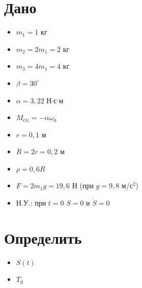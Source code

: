 \documentclass{article}
\begin{document}
\section*{Дано}
\vspace{-0.5cm}
\begin{itemize}
	\item $m_1 = 1$ кг
	\item $m_2 = 2m_1 = 2$ кг
	\item $m_3 = 4m_1 = 4$ кг
	\item $\beta = 30^\circ$
	\item $\alpha = 3,22$ Н$\cdot$с$\cdot$м
	\item $M_{Oz} = -\alpha \omega_0$
	\item $r = 0,1$ м
	\item $R = 2r = 0,2$ м
	\item $\rho = 0,6R$
	\item $F = 2m_1g = 19,6$ Н (при $g = 9,8$ м/с$^2$)
	\item Н.У.: при $t = 0$ $S = 0$ и $\dot{S} = 0$
\end{itemize}
 \vspace{0.1cm}
\section*{Определить}
\vspace{-0.4cm}
\begin{itemize}
	\item $S(t)$
	\item $T_0$
\end{itemize}
\newpage
\end{document}

